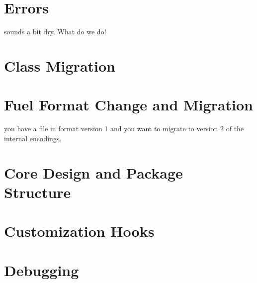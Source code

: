 \documentclass[a4paper,10pt,twoside]{book}
\begin{document}
\section{Errors}
sounds a bit dry. What do we do!


\section{Class Migration}

\section{Fuel Format Change and Migration}

you have a file in format version 1 and you want to migrate to version 2 of the internal encodings.

\section{Core Design and Package Structure}

\section{Customization Hooks}

\section{Debugging}




\ifx\wholebook\relax\else
   
   
\end{document}
